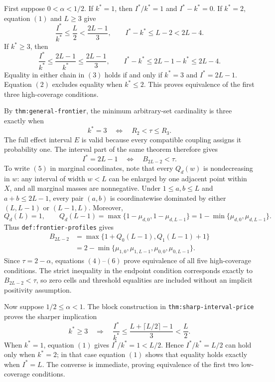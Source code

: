 First suppose \(0<\alpha<1/2\).  If \(k^*=1\), then \(I^*/k^*=1\) and \(I^*-k^*=0\).  If \(k^*=2\), equation \((1)\) and \(L\geq3\) give
\[
\frac{I^*}{k^*}\leq\frac L2<\frac{2L-1}{3},
\qquad
I^*-k^*\leq L-2<2L-4.
\tag{2}
\]
If \(k^*\geq3\), then
\[
\frac{I^*}{k^*}\leq\frac{2L-1}{k^*}\leq\frac{2L-1}{3},
\qquad
I^*-k^*\leq2L-1-k^*\leq2L-4.
\tag{3}
\]
Equality in either chain in \((3)\) holds if and only if \(k^*=3\) and \(I^*=2L-1\).  Equation \((2)\) excludes equality when \(k^*\leq2\).  This proves equivalence of the first three high-coverage conditions.

By \texttt{thm:general-frontier}, the minimum arbitrary-set cardinality is three exactly when
\[
k^*=3
\quad\Longleftrightarrow\quad
R_2<\tau\leq R_3.
\tag{4}
\]
The full effect interval \(E\) is valid because every compatible coupling assigns it probability one.  The interval part of the same theorem therefore gives
\[
I^*=2L-1
\quad\Longleftrightarrow\quad
B_{2L-2}<\tau.
\tag{5}
\]
To write \((5)\) in marginal coordinates, note that every \(Q_d(w)\) is nondecreasing in \(w\): any interval of width \(w<L\) can be enlarged by one adjacent point within \(X\), and all marginal masses are nonnegative.  Under \(1\leq a,b\leq L\) and \(a+b\leq2L-1\), every pair \((a,b)\) is coordinatewise dominated by either \((L,L-1)\) or \((L-1,L)\).  Moreover,
\[
Q_d(L)=1,
\qquad
Q_d(L-1)
=\max\{1-\mu_{d,0},1-\mu_{d,L-1}\}
=1-\min\{\mu_{d,0},\mu_{d,L-1}\}.
\]
Thus \texttt{def:frontier-profiles} gives
\[
\begin{aligned}
B_{2L-2}
&=\max\{1+Q_0(L-1),Q_1(L-1)+1\}\\
&=2-\min\{\mu_{1,0},\mu_{1,L-1},\mu_{0,0},\mu_{0,L-1}\}.
\end{aligned}
\tag{6}
\]
Since \(\tau=2-\alpha\), equations \((4)\)--\((6)\) prove equivalence of all five high-coverage conditions.  The strict inequality in the endpoint condition corresponds exactly to \(B_{2L-2}<\tau\), so zero cells and threshold equalities are included without an implicit positivity assumption.

Now suppose \(1/2\leq\alpha<1\).  The block construction in \texttt{thm:sharp-interval-price} proves the sharper implication
\[
k^*\geq3
\quad\Longrightarrow\quad
\frac{I^*}{k^*}
\leq\frac{L+\lceil L/2\rceil-1}{3}
<\frac L2.
\tag{7}
\]
When \(k^*=1\), equation \((1)\) gives \(I^*/k^*=1<L/2\).  Hence \(I^*/k^*=L/2\) can hold only when \(k^*=2\); in that case equation \((1)\) shows that equality holds exactly when \(I^*=L\).  The converse is immediate, proving equivalence of the first two low-coverage conditions.

